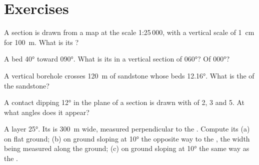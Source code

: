 \section{Exercises}

\begin{exercise}[$\star$]\label{exo:b1:cross-sections:1}
A section is drawn from a map at the scale 1:25\,000, with a vertical scale
of \qty{1}{cm} for \qty{100}{m}. What is its ?
\end{exercise}

\begin{exercise}[$\star$]\label{exo:b1:cross-sections:2}
A bed  \ang{40} toward \ang{090}. What is its  in a vertical
section of  \ang{060}? Of  \ang{000}?
\end{exercise}

\begin{exercise}[$\star$]\label{exo:b1:cross-sections:3}
A vertical borehole crosses \qty{120}{m} of sandstone whose beds 
\ang{12.16}. What is the  of the sandstone?
\end{exercise}

\begin{exercise}[$\star$]\label{exo:b1:cross-sections:4}
A contact dipping \ang{12} in the plane of a section is drawn with  of 2, 3 and 5. At what angles does it appear?
\end{exercise}

\begin{exercise}[$\star\star$]\label{exo:b1:cross-sections:5}
A layer  \ang{25}. Its  is \qty{300}{m} wide, measured
perpendicular to the . Compute its  (a) on flat ground;
(b) on ground sloping at \ang{10} the opposite way to the , the width
being measured along the ground; (c) on ground sloping at \ang{10} the same
way as the .
\end{exercise}

